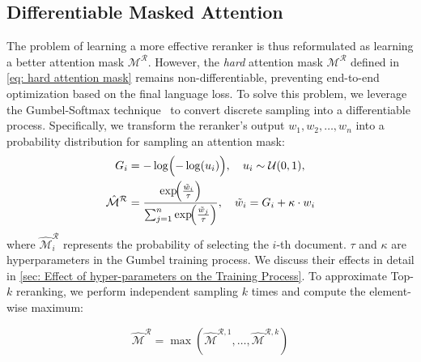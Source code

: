 


\subsection{Differentiable Masked Attention}\label{sec: DMA}
The problem of learning a more effective reranker is thus reformulated as learning a better attention mask $\mathcal{M}^{\mathcal{R}}$. However, the \textit{hard} attention mask $\mathcal{M}^{\mathcal{R}}$ defined in \autoref{eq: hard attention mask} remains non-differentiable, preventing end-to-end optimization based on the final language loss. To solve this problem, we leverage the Gumbel-Softmax technique~\cite{DBLP:conf/iclr/JangGP17} to convert discrete sampling into a differentiable process. Specifically, we transform the reranker’s output $w_1, w_2, \dots, w_n$ into a probability distribution for sampling an attention mask:
\begin{equation}
\begin{aligned}\label{eq: single sample}
  G_i &= -\log\Bigl(-\log(u_i)\Bigr), \quad u_i \sim \mathcal{U}(0,1),\\
  \hat{\mathcal{M}}^\mathcal{R} &= \frac{\exp\!\Bigl(\tfrac{\tilde{w}_i}{\tau}\Bigr)}
              {\sum_{j=1}^{n}\exp\!\Bigl(\tfrac{\tilde{w}_j}{\tau}\Bigr)}, \quad \tilde{w}_i = G_i + \kappa \cdot w_i
\end{aligned}
\end{equation}
where $\hat{\mathcal{M}}^\mathcal{R}_i$ represents the probability of selecting the $i$-th document. \(\tau\) and \(\kappa\) are hyperparameters in the Gumbel training process. We discuss their effects in detail in \autoref{sec: Effect of hyper-parameters on the Training Process}. To approximate Top-$k$ reranking, we perform independent sampling $k$ times and compute the element-wise maximum:

\begin{equation}
    \hat{\mathcal{M}}^{\mathcal{R}} = \max \left( \hat{\mathcal{M}}^{\mathcal{R},1}, \dots, \hat{\mathcal{M}}^{\mathcal{R},k} \right)
    \label{eq:subset_sampling}
\end{equation}


